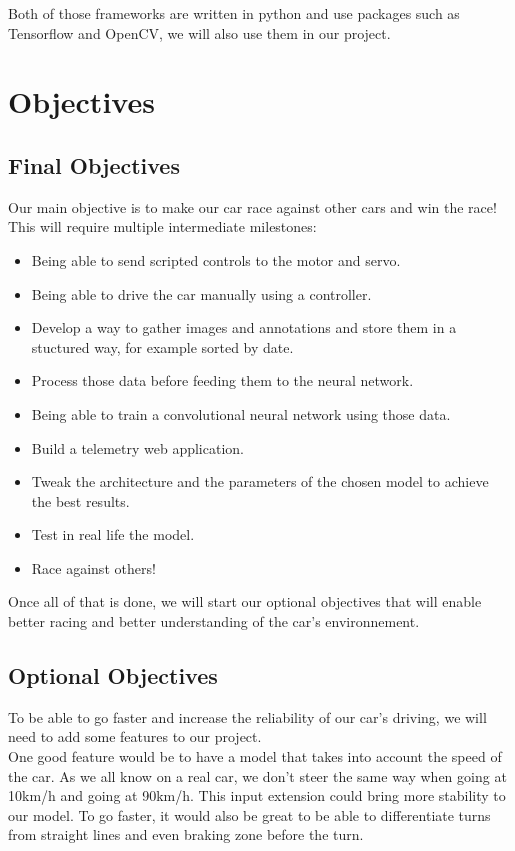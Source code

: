 \documentclass[12pt]{article}
\begin{document}
Both of those frameworks are written in python and use packages such as Tensorflow and OpenCV, we will also use them in our project.
\newpage

\section{Objectives}

\subsection{Final Objectives}
Our main objective is to make our car race against other cars and win the race!
This will require multiple intermediate milestones:
\begin{itemize}
\item Being able to send scripted controls to the motor and servo.
\item Being able to drive the car manually using a controller.
\item Develop a way to gather images and annotations and store them in a stuctured way, for example sorted by date.
\item Process those data before feeding them to the neural network.
\item Being able to train a convolutional neural network using those data.
\item Build a telemetry web application.
\item Tweak the architecture and the parameters of the chosen model to achieve the best results.
\item Test in real life the model.
\item Race against others!
\end{itemize}
Once all of that is done, we will start our optional objectives that will enable better racing and better understanding of the car's environnement.

\subsection{Optional Objectives}
To be able to go faster and increase the reliability of our car's driving, we will need to add some features to our project. \\

One good feature would be to have a model that takes into account the speed of the car. As we all know on a real car, we don't steer the same way when going at 10km/h and going at 90km/h. This input extension could bring more stability to our model.
To go faster, it would also be great to be able to differentiate turns from straight lines and even braking zone before the turn. \\
\end{document}

